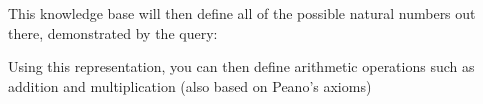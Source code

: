 This knowledge base will then define all of the possible natural numbers
out there, demonstrated by the query:

\begin{Shaded}
\begin{Highlighting}[]
\NormalTok{)}
\end{Highlighting}
\end{Shaded}

\begin{Shaded}
\begin{Highlighting}[]
 \KeywordTok{=} 
 \KeywordTok{=}\NormalTok{)}
 \KeywordTok{=}\NormalTok{))}
 \KeywordTok{=}\NormalTok{)))}
\end{Highlighting}
\end{Shaded}

Using this representation, you can then define arithmetic operations
such as addition and multiplication (also based on Peano's axioms)

\begin{Shaded}
\begin{Highlighting}[]
\NormalTok{)}
\NormalTok{)) }\KeywordTok{:{-}}\NormalTok{)}

\KeywordTok{,}\KeywordTok{,}\NormalTok{)}
\KeywordTok{,}\NormalTok{)}\KeywordTok{,}\NormalTok{)) }\KeywordTok{:{-}}\KeywordTok{,}\KeywordTok{,}\NormalTok{)}

\DataTypeTok{\_}\KeywordTok{,}\KeywordTok{,}\NormalTok{)}
\KeywordTok{,}\NormalTok{)}\KeywordTok{,}\NormalTok{) }\KeywordTok{:{-}}\KeywordTok{,}\KeywordTok{,}\NormalTok{)}\KeywordTok{,}\KeywordTok{,}\KeywordTok{,}\NormalTok{)}
\end{Highlighting}
\end{Shaded}

